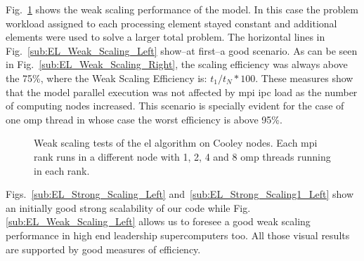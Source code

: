 {Fig.~\ref{fig:EL_Weak_Scaling} shows the weak scaling performance of the model. In this case the problem workload assigned to each processing element stayed constant and additional elements were used to solve a larger total problem. The horizontal lines in Fig.~\ref{sub:EL_Weak_Scaling_Left} show--at first--a good scenario. As can be seen in Fig.~\ref{sub:EL_Weak_Scaling_Right}, the scaling efficiency was always above the 75\%, where the Weak Scaling Efficiency is: $t_1 / t_N * 100$. These measures show that the model parallel execution was not affected by \gls{mpi} \gls{ipc} load as the number of computing nodes increased. This scenario is specially evident for the case of one \gls{omp} thread in whose case the worst efficiency is above 95\%.

\begin{figure}[tb] 
    \centering
    \hfill

	\caption{Weak scaling tests of the \gls{el} algorithm on Cooley nodes. Each \gls{mpi} rank runs in a different node with 1, 2, 4 and 8 \gls{omp} threads running in each rank.}
  \label{fig:EL_Weak_Scaling} 
\end{figure}

Figs.~\ref{sub:EL_Strong_Scaling_Left} and~\ref{sub:EL_Strong_Scaling1_Left} show an initially good strong scalability of our code while Fig. \ref{sub:EL_Weak_Scaling_Left} allows us to foresee a good weak scaling performance in high end leadership supercomputers too. All those visual results are supported by good measures of efficiency.
}











